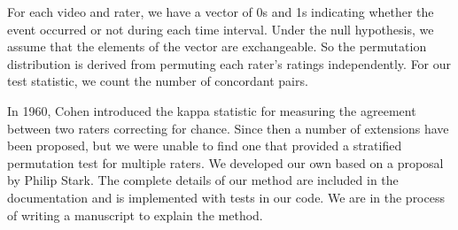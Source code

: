 For each video and rater, we have a vector of 0s and 1s indicating whether the
event occurred or not during each time interval.  Under the null hypothesis, we
assume that the elements of the vector are exchangeable.  So the permutation
distribution is derived from permuting each rater's ratings independently.  For
our test statistic, we count the number of concordant pairs.

In 1960, Cohen \cite{cohen1960} introduced the kappa statistic for measuring
the agreement between two raters correcting for chance.  Since then a number of
extensions have been proposed, but we were unable to find one that provided a
stratified permutation test for multiple raters. We developed our own based
on a proposal by Philip Stark. The complete details of our method are included
in the documentation and is implemented with tests in our code.  We are in the
process of writing a manuscript to explain the method.


%


